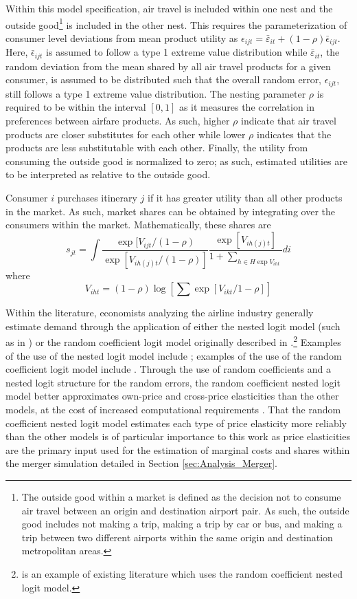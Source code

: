 \documentclass{article}
\begin{document}
    Within this model specification, air travel is included within one nest and the outside good\footnote{The outside good within a market is defined as the decision not to consume air travel between an origin and destination airport pair. As such, the outside good includes not making a trip, making a trip by car or bus, and making a trip between two different airports within the same origin and destination metropolitan areas.} is included in the other nest. This requires the parameterization of consumer level deviations from mean product utility as $\epsilon_{ijt} = \bar{\varepsilon}_{it} + (1-\rho) \bar{\epsilon}_{ijt}$. Here, $\bar{\epsilon}_{ijt}$ is assumed to follow a type 1 extreme value distribution while $\bar{\varepsilon}_{it}$,  the random deviation from the mean shared by all air travel products for a given consumer, is assumed to be distributed such that the overall random error, $\epsilon_{ijt}$, still follows a type 1 extreme value distribution. The nesting parameter $\rho$ is required to be within the interval $[0,1]$ as it measures the correlation in preferences between airfare products. As such, higher $\rho$ indicate that air travel products are closer substitutes for each other while lower $\rho$ indicates that the products are less substitutable with each other. Finally, the utility from consuming the outside good is normalized to zero; as such, estimated utilities are to be interpreted as relative to the outside good.
	
	Consumer $i$ purchases itinerary $j$ if it has greater utility than all other products in the market. As such, market shares can be obtained by integrating over the consumers within the market. Mathematically, these shares are \[s_{jt} = \int \frac{\exp[V_{ijt} / (1-\rho)}{\exp [V_{i h(j) t} / (1 - \rho)]} \frac{\exp[V_{ih(j)t}]}{1 + \sum_{h \in H \exp V_{iht}}} d{{i}}\] where \[V_{iht} = (1 - \rho) \log\left[\sum \exp[V_{ikt} / 1 - \rho]\right] \] 

    Within the literature, economists analyzing the airline industry generally estimate demand through the application of either the nested logit model (such as in \citet{turner_access_2022,ciliberto_market_2021, aguirregabiria_dynamic_2012}) or the random coefficient logit model originally described in \citet{berry_automobile_1995}.\footnote{\citet{bet_market_2021} is an example of existing literature which uses the random coefficient nested logit model.} Examples of the use of the nested logit model include   \citet{turner_access_2022,ciliberto_market_2021, aguirregabiria_dynamic_2012}; examples of the use of the random coefficient logit model include \citet{ gayle_efficiency_2013, berry_tracing_2010}. Through the use of random coefficients and a nested logit structure for the random errors, the random coefficient nested logit model better approximates own-price and cross-price elasticities than the other models, at the cost of increased computational requirements \citep{grigolon_nested_2014}. That the random coefficient nested logit model estimates each type of price elasticity more reliably than the other models is of particular importance to this work as price elasticities are the primary input used for the estimation of marginal costs and shares within the merger simulation detailed in Section \ref{sec:Analysis_Merger}. 
	
\end{document}
